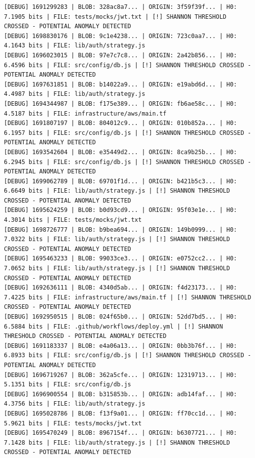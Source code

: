 \documentclass[12pt, a4paper, oneside]{report}
\begin{document}
\begin{lstlisting}[basicstyle=\tiny\ttfamily]
[DEBUG] 1691299283 | BLOB: 328ac8a7... | ORIGIN: 3f59f39f... | H0: 7.1905 bits | FILE: tests/mocks/jwt.txt | [!] SHANNON THRESHOLD CROSSED - POTENTIAL ANOMALY DETECTED
[DEBUG] 1698830176 | BLOB: 9c1e4238... | ORIGIN: 723c0aa7... | H0: 4.1643 bits | FILE: lib/auth/strategy.js
[DEBUG] 1696023015 | BLOB: 97e7c7c8... | ORIGIN: 2a42b856... | H0: 6.4596 bits | FILE: src/config/db.js | [!] SHANNON THRESHOLD CROSSED - POTENTIAL ANOMALY DETECTED
[DEBUG] 1697631851 | BLOB: b14022a9... | ORIGIN: e19abd6d... | H0: 4.4987 bits | FILE: lib/auth/strategy.js
[DEBUG] 1694344987 | BLOB: f175e389... | ORIGIN: fb6ae58c... | H0: 4.5187 bits | FILE: infrastructure/aws/main.tf
[DEBUG] 1691807197 | BLOB: 804012c9... | ORIGIN: 010b852a... | H0: 6.1957 bits | FILE: src/config/db.js | [!] SHANNON THRESHOLD CROSSED - POTENTIAL ANOMALY DETECTED
[DEBUG] 1693542604 | BLOB: e35449d2... | ORIGIN: 8ca9b25b... | H0: 6.2945 bits | FILE: src/config/db.js | [!] SHANNON THRESHOLD CROSSED - POTENTIAL ANOMALY DETECTED
[DEBUG] 1699062789 | BLOB: 69701f1d... | ORIGIN: b421b5c3... | H0: 6.6649 bits | FILE: lib/auth/strategy.js | [!] SHANNON THRESHOLD CROSSED - POTENTIAL ANOMALY DETECTED
[DEBUG] 1695624259 | BLOB: b0d93cd9... | ORIGIN: 95f03e1e... | H0: 4.3014 bits | FILE: tests/mocks/jwt.txt
[DEBUG] 1698726777 | BLOB: b9bea694... | ORIGIN: 149b0999... | H0: 7.0322 bits | FILE: lib/auth/strategy.js | [!] SHANNON THRESHOLD CROSSED - POTENTIAL ANOMALY DETECTED
[DEBUG] 1695463233 | BLOB: 99033ce3... | ORIGIN: e0752cc2... | H0: 7.0652 bits | FILE: lib/auth/strategy.js | [!] SHANNON THRESHOLD CROSSED - POTENTIAL ANOMALY DETECTED
[DEBUG] 1692636111 | BLOB: 4340d5ab... | ORIGIN: f4d23173... | H0: 7.4225 bits | FILE: infrastructure/aws/main.tf | [!] SHANNON THRESHOLD CROSSED - POTENTIAL ANOMALY DETECTED
[DEBUG] 1692950515 | BLOB: 024f65b0... | ORIGIN: 52dd7bd5... | H0: 6.5884 bits | FILE: .github/workflows/deploy.yml | [!] SHANNON THRESHOLD CROSSED - POTENTIAL ANOMALY DETECTED
[DEBUG] 1691183337 | BLOB: e4a06a13... | ORIGIN: 0bb3b76f... | H0: 6.8933 bits | FILE: src/config/db.js | [!] SHANNON THRESHOLD CROSSED - POTENTIAL ANOMALY DETECTED
[DEBUG] 1696719267 | BLOB: 362a5cfe... | ORIGIN: 12319713... | H0: 5.1351 bits | FILE: src/config/db.js
[DEBUG] 1696900554 | BLOB: b315853b... | ORIGIN: adb14faf... | H0: 4.3756 bits | FILE: lib/auth/strategy.js
[DEBUG] 1695028786 | BLOB: f13f9a01... | ORIGIN: ff70cc1d... | H0: 5.9621 bits | FILE: tests/mocks/jwt.txt
[DEBUG] 1695470249 | BLOB: 8967154f... | ORIGIN: b6307721... | H0: 7.1428 bits | FILE: lib/auth/strategy.js | [!] SHANNON THRESHOLD CROSSED - POTENTIAL ANOMALY DETECTED

\end{lstlisting}
\end{document}
